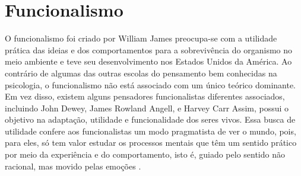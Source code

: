 \section{Funcionalismo}\label{funcionalismo}

O funcionalismo foi criado por William James preocupa-se com a utilidade prática das ideias e dos comportamentos para a sobrevivência do organismo no meio ambiente e teve seu desenvolvimento nos Estados Unidos da América. 
Ao contrário de algumas das outras escolas do pensamento bem conhecidas na psicologia, o funcionalismo não está associado com um único teórico dominante. 
Em vez disso, existem alguns pensadores funcionalistas diferentes associados, incluindo John Dewey, James Rowland Angell, e Harvey Carr
Assim, possui o objetivo na adaptação, utilidade e funcionalidade dos seres vivos.
Essa busca de utilidade confere aos funcionalistas um modo pragmatista de ver o mundo, pois, para eles, só tem valor estudar os processos mentais que têm um sentido prático por meio da experiência e do comportamento, isto é, guiado pelo sentido não racional, mas movido pelas emoções \cite{silva2007psicologia_educacao}.
